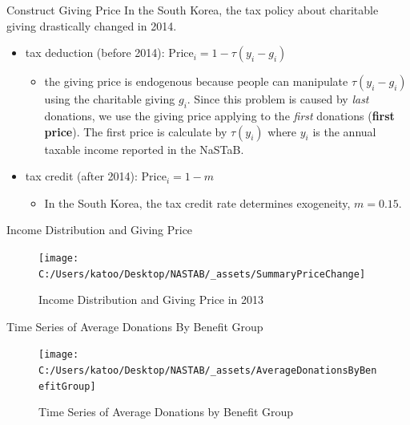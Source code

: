 \documentclass[
  ignorenonframetext,
]{beamer}
\providecommand{\tightlist}{%
  \setlength{\itemsep}{0pt}\setlength{\parskip}{0pt}}
\begin{document}
\begin{frame}{Construct Giving Price}
\protect\hypertarget{construct-giving-price}{}
In the South Korea, the tax policy about charitable giving drastically
changed in 2014.

\begin{itemize}
\tightlist
\item
  tax deduction (before 2014): \(\text{Price}_i = 1 - \tau(y_i - g_i)\)

  \begin{itemize}
  \tightlist
  \item
    the giving price is endogenous because people can manipulate
    \(\tau(y_i - g_i)\) using the charitable giving \(g_i\). Since this
    problem is caused by \emph{last} donations, we use the giving price
    applying to the \emph{first} donations (\textbf{first price}). The
    first price is calculate by \(\tau(y_i)\) where \(y_i\) is the
    annual taxable income reported in the NaSTaB.
  \end{itemize}
\item
  tax credit (after 2014): \(\text{Price}_i = 1 - m\)

  \begin{itemize}
  \tightlist
  \item
    In the South Korea, the tax credit rate determines exogeneity,
    \(m = 0.15\).
  \end{itemize}
\end{itemize}
\end{frame}

\begin{frame}{Income Distribution and Giving Price}
\protect\hypertarget{income-distribution-and-giving-price}{}
\begin{figure}
\texttt{[image: C:/Users/katoo/Desktop/NASTAB/\_assets/SummaryPriceChange]} \caption{Income Distribution and Giving Price in 2013}\label{fig:unnamed-chunk-2}
\end{figure}
\end{frame}

\begin{frame}{Time Series of Average Donations By Benefit Group}
\protect\hypertarget{time-series-of-average-donations-by-benefit-group}{}
\begin{figure}
\texttt{[image: C:/Users/katoo/Desktop/NASTAB/\_assets/AverageDonationsByBenefitGroup]} \caption{Time Series of Average Donations by Benefit Group}\label{fig:unnamed-chunk-3}
\end{figure}
\end{frame}
\end{document}
